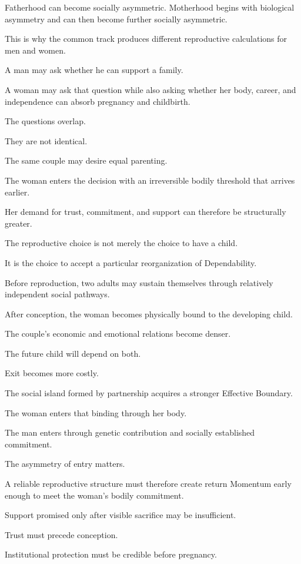 Fatherhood can become socially asymmetric. Motherhood begins with biological asymmetry and can then become further socially asymmetric.

This is why the common track produces different reproductive calculations for men and women.

A man may ask whether he can support a family.

A woman may ask that question while also asking whether her body, career, and independence can absorb pregnancy and childbirth.

The questions overlap.

They are not identical.

The same couple may desire equal parenting.

The woman enters the decision with an irreversible bodily threshold that arrives earlier.

Her demand for trust, commitment, and support can therefore be structurally greater.

The reproductive choice is not merely the choice to have a child.

It is the choice to accept a particular reorganization of Dependability.

Before reproduction, two adults may sustain themselves through relatively independent social pathways.

After conception, the woman becomes physically bound to the developing child.

The couple’s economic and emotional relations become denser.

The future child will depend on both.

Exit becomes more costly.

The social island formed by partnership acquires a stronger Effective Boundary.

The woman enters that binding through her body.

The man enters through genetic contribution and socially established commitment.

The asymmetry of entry matters.

A reliable reproductive structure must therefore create return Momentum early enough to meet the woman’s bodily commitment.

Support promised only after visible sacrifice may be insufficient.

Trust must precede conception.

Institutional protection must be credible before pregnancy.

